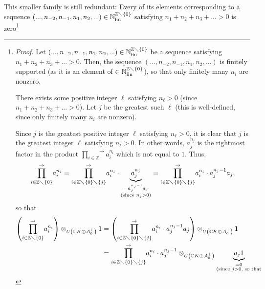 \documentclass
[numbers=enddot,12pt,final,onecolumn,german,notitlepage]{scrartcl}%
\theoremstyle{definition}
\begin{document}
This smaller family is still redundant: Every of its elements corresponding to
a sequence $\left(  ...,n_{-2},n_{-1},n_{1},n_{2},...\right)  \in
\mathbb{N}_{\operatorname*{fin}}^{\mathbb{Z}\diagdown\left\{  0\right\}  }$
satisfying $n_{1}+n_{2}+n_{3}+...>0$ is zero\footnote{\textit{Proof.} Let
$\left(  ...,n_{-2},n_{-1},n_{1},n_{2},...\right)  \in\mathbb{N}%
_{\operatorname*{fin}}^{\mathbb{Z}\diagdown\left\{  0\right\}  }$ be a
sequence satisfying $n_{1}+n_{2}+n_{3}+...>0$. Then, the sequence $\left(
...,n_{-2},n_{-1},n_{1},n_{2},...\right)  $ is finitely supported (as it is an
element of $\in\mathbb{N}_{\operatorname*{fin}}^{\mathbb{Z}\diagdown\left\{
0\right\}  }$), so that only finitely many $n_{i}$ are nonzero.
\par
There exists some positive integer $\ell$ satisfying $n_{\ell}>0$ (since
$n_{1}+n_{2}+n_{3}+...>0$). Let $j$ be the greatest such $\ell$ (this is
well-defined, since only finitely many $n_{i}$ are nonzero).
\par
Since $j$ is the greatest positive integer $\ell$ satisfying $n_{\ell}>0$, it
is clear that $j$ is the greatest integer $\ell$ satisfying $n_{\ell}>0$. In
other words, $a_{j}^{n_{j}}$ is the rightmost factor in the product
$\overset{\rightarrow}{\prod\limits_{i\in\mathbb{Z}}}a_{i}^{n_{i}}$ which is
not equal to $1$. Thus,%
\[
\overset{\rightarrow}{\prod\limits_{i\in\mathbb{Z}\diagdown\left\{  0\right\}
}}a_{i}^{n_{i}}=\overset{\rightarrow}{\prod\limits_{i\in\mathbb{Z}%
\diagdown\left\{  0\right\}  \diagdown\left\{  j\right\}  }}a_{i}^{n_{i}}%
\cdot\underbrace{a_{j}^{n_{j}}}_{\substack{=a_{j}^{n_{j}-1}a_{j}\\\text{(since
}n_{j}>0\text{)}}}=\overset{\rightarrow}{\prod\limits_{i\in\mathbb{Z}%
\diagdown\left\{  0\right\}  \diagdown\left\{  j\right\}  }}a_{i}^{n_{i}}\cdot
a_{j}^{n_{j}-1}a_{j},
\]
so that%
\begin{align*}
\left(  \overset{\rightarrow}{\prod\limits_{i\in\mathbb{Z}\diagdown\left\{
0\right\}  }}a_{i}^{n_{i}}\right)  \otimes_{U\left(  \mathbb{C}K\oplus
\mathcal{A}_{0}^{+}\right)  }1  &  =\left(  \overset{\rightarrow
}{\prod\limits_{i\in\mathbb{Z}\diagdown\left\{  0\right\}  \diagdown\left\{
j\right\}  }}a_{i}^{n_{i}}\cdot a_{j}^{n_{j}-1}a_{j}\right)  \otimes_{U\left(
\mathbb{C}K\oplus\mathcal{A}_{0}^{+}\right)  }1\\
&  =\overset{\rightarrow}{\prod\limits_{i\in\mathbb{Z}\diagdown\left\{
0\right\}  \diagdown\left\{  j\right\}  }}a_{i}^{n_{i}}\cdot a_{j}^{n_{j}%
-1}\otimes_{U\left(  \mathbb{C}K\oplus\mathcal{A}_{0}^{+}\right)
}\underbrace{a_{j}1}_{\substack{=0\\\text{(since }j>0\text{, so that}%
}}
\end{align*}}
\end{document}
